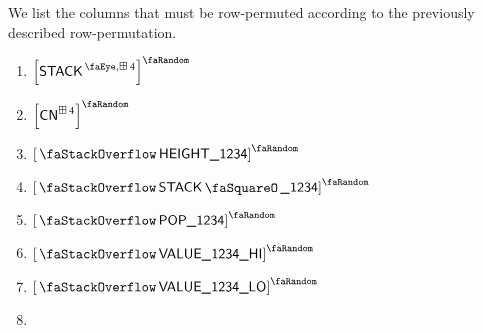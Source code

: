 We list the columns that must be row-permuted according to the previously described row-permutation.
\begin{multicols}{2}
	\begin{enumerate}
		\item $\order{\peekStackFour}$
		\item $\order{\cn^{\cc4}}$
		\item $\order{\stackItemHeight{\col{1234}}}$
		\item $\order{\stackItemStamp{\col{1234}}}$
		\item $\order{\stackItemPop{\col{1234}}}$
		\item $\order{\stackItemValHi{\col{1234}}}$
		\item $\order{\stackItemValLo{\col{1234}}}$
		\item[\vspace{\fill}]
	\end{enumerate}
\end{multicols}

